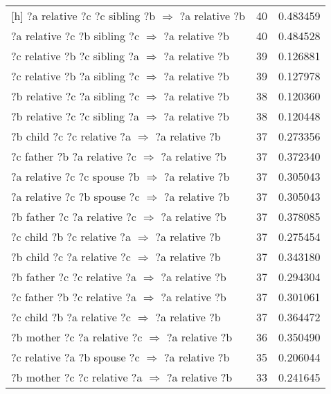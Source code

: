 \begin{longtable}{lrr}[h]
 ?a  relative  ?c  ?c  sibling  ?b   $\Rightarrow$ ?a  relative  ?b &           40 &        0.483459 \\
 ?a  relative  ?c  ?b  sibling  ?c   $\Rightarrow$ ?a  relative  ?b &           40 &        0.484528 \\
 ?c  relative  ?b  ?c  sibling  ?a   $\Rightarrow$ ?a  relative  ?b &           39 &        0.126881 \\
 ?c  relative  ?b  ?a  sibling  ?c   $\Rightarrow$ ?a  relative  ?b &           39 &        0.127978 \\
 ?b  relative  ?c  ?a  sibling  ?c   $\Rightarrow$ ?a  relative  ?b &           38 &        0.120360 \\
 ?b  relative  ?c  ?c  sibling  ?a   $\Rightarrow$ ?a  relative  ?b &           38 &        0.120448 \\
   ?b  child  ?c  ?c  relative  ?a   $\Rightarrow$ ?a  relative  ?b &           37 &        0.273356 \\
  ?c  father  ?b  ?a  relative  ?c   $\Rightarrow$ ?a  relative  ?b &           37 &        0.372340 \\
  ?a  relative  ?c  ?c  spouse  ?b   $\Rightarrow$ ?a  relative  ?b &           37 &        0.305043 \\
  ?a  relative  ?c  ?b  spouse  ?c   $\Rightarrow$ ?a  relative  ?b &           37 &        0.305043 \\
  ?b  father  ?c  ?a  relative  ?c   $\Rightarrow$ ?a  relative  ?b &           37 &        0.378085 \\
   ?c  child  ?b  ?c  relative  ?a   $\Rightarrow$ ?a  relative  ?b &           37 &        0.275454 \\
   ?b  child  ?c  ?a  relative  ?c   $\Rightarrow$ ?a  relative  ?b &           37 &        0.343180 \\
  ?b  father  ?c  ?c  relative  ?a   $\Rightarrow$ ?a  relative  ?b &           37 &        0.294304 \\
  ?c  father  ?b  ?c  relative  ?a   $\Rightarrow$ ?a  relative  ?b &           37 &        0.301061 \\
   ?c  child  ?b  ?a  relative  ?c   $\Rightarrow$ ?a  relative  ?b &           37 &        0.364472 \\
  ?b  mother  ?c  ?a  relative  ?c   $\Rightarrow$ ?a  relative  ?b &           36 &        0.350490 \\
  ?c  relative  ?a  ?b  spouse  ?c   $\Rightarrow$ ?a  relative  ?b &           35 &        0.206044 \\
  ?b  mother  ?c  ?c  relative  ?a   $\Rightarrow$ ?a  relative  ?b &           33 &        0.241645 \\

\end{longtable}
